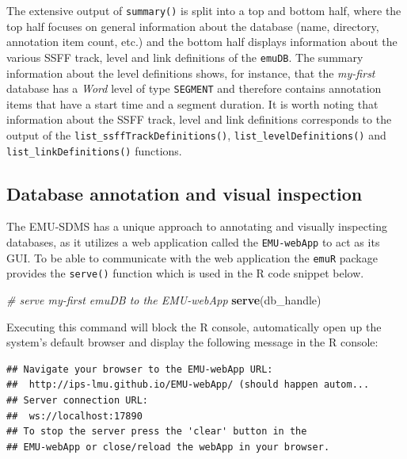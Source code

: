 \documentclass[]{book}
\newenvironment{Shaded}{\begin{snugshade}}{\end{snugshade}}
\newcommand{\CommentTok}[1]{\textcolor[rgb]{0.56,0.35,0.01}{\textit{#1}}}
\newcommand{\KeywordTok}[1]{\textcolor[rgb]{0.13,0.29,0.53}{\textbf{#1}}}
\newcommand{\NormalTok}[1]{#1}
\begin{document}
The extensive output of \texttt{summary()} is split into a top and bottom half, where the top half focuses on general information about the database (name, directory, annotation item count, etc.) and the bottom half displays information about the various SSFF track, level and link definitions of the \texttt{emuDB}. The summary information about the level definitions shows, for instance, that the \emph{my-first} database has a \emph{Word} level of type \texttt{SEGMENT} and therefore contains annotation items that have a start time and a segment duration. It is worth noting that information about the SSFF track, level and link definitions corresponds to the output of the \texttt{list\_ssffTrackDefinitions()}, \texttt{list\_levelDefinitions()} and \texttt{list\_linkDefinitions()} functions.

\hypertarget{database-annotation-and-visual-inspection}{%
\subsection{Database annotation and visual inspection}\label{database-annotation-and-visual-inspection}}

The EMU-SDMS has a unique approach to annotating and visually inspecting databases, as it utilizes a web application called the \texttt{EMU-webApp} to act as its GUI. To be able to communicate with the web application the \texttt{emuR} package provides the \texttt{serve()} function which is used in the R code snippet below.

\begin{Shaded}
\begin{Highlighting}[]
\CommentTok{# serve my-first emuDB to the EMU-webApp}
\KeywordTok{serve}\NormalTok{(db_handle)}
\end{Highlighting}
\end{Shaded}

Executing this command will block the R console, automatically open up the system's default browser and display the following message in the R console:

\begin{verbatim}
## Navigate your browser to the EMU-webApp URL: 
##  http://ips-lmu.github.io/EMU-webApp/ (should happen autom...
## Server connection URL:
##  ws://localhost:17890
## To stop the server press the 'clear' button in the 
## EMU-webApp or close/reload the webApp in your browser.
\end{verbatim}
\end{document}
